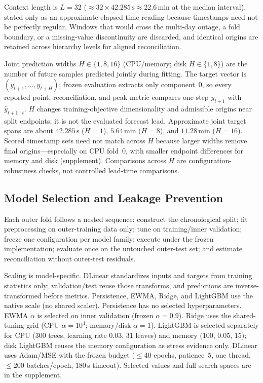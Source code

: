 \documentclass[a4paper,fleqn]{cas-dc}
\begin{document}
Context length is $L=32$
($\approx 32\times 42.285\,\mathrm{s}\approx 22.6$\,min at the median interval),
stated only as an approximate elapsed-time reading because timestamps need not be
perfectly regular.
Windows that would cross the multi-day outage, a fold boundary, or a
missing-value discontinuity are discarded, and identical origins are retained
across hierarchy levels for aligned reconciliation.

Joint prediction widths $H\in\{1,8,16\}$ ({CPU}/memory; disk $H\in\{1,8\}$)
are the number of future samples predicted jointly during fitting.
The target vector is $(y_{t+1},\ldots,y_{t+H})$; frozen evaluation extracts only
component~$0$, so every reported point, reconciliation, and peak metric compares
one-step $y_{t+1}$ with $\hat y_{t+1\mid t}$.
$H$ changes training-objective dimensionality and admissible origins near split
endpoints; it is not the evaluated forecast lead.
Approximate joint target spans are about $42.285$\,s ($H{=}1$), $5.64$\,min
($H{=}8$), and $11.28$\,min ($H{=}16$).
Scored timestamp sets need not match across $H$ because larger widths remove
final origins---especially on {CPU} fold~$0$, with smaller endpoint differences
for memory and disk (supplement).
Comparisons across $H$ are configuration-robustness checks, not controlled
lead-time comparisons.

\subsection{Model Selection and Leakage Prevention}
Each outer fold follows a nested sequence: construct the chronological split;
fit preprocessing on outer-training data only; tune on training/inner
validation; freeze one configuration per model family; execute under the frozen
implementation; evaluate once on the untouched outer-test set; and estimate
reconciliation without outer-test residuals.

Scaling is model-specific.
DLinear standardizes inputs and targets from training statistics only;
validation/test reuse those transforms, and predictions are inverse-transformed
before metrics.
Persistence, {EWMA}, Ridge, and LightGBM use the native scale (no shared
scaler).
Persistence has no selected hyperparameters.
{EWMA} $\alpha$ is selected on inner validation (frozen $\alpha{=}0.9$).
Ridge uses the shared-tuning grid ({CPU} $\alpha{=}10^{4}$; memory/disk
$\alpha{=}1$).
LightGBM is selected separately for {CPU}
($300$ trees, learning rate $0.03$, $31$ leaves) and memory
($100$, $0.05$, $15$); disk LightGBM reuses the memory configuration as stress
evidence only.
DLinear uses Adam/{MSE} with the frozen budget ($\le$40 epochs, patience~$5$,
one thread, $\le$200 batches/epoch, $180$\,s timeout).
Selected values and full search spaces are in the supplement.
\end{document}
